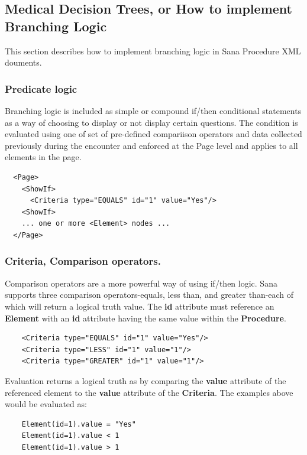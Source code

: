 \documentclass[a4paper,10pt]{article}
\begin{document}
\subsection{Medical Decision Trees, or How to implement Branching Logic}
This section describes how to implement branching logic in Sana Procedure XML
douments. 

\subsubsection{Predicate logic}
Branching logic is included as simple or compound if/then conditional statements
as a way of choosing to display or not display certain questions. The condition
is evaluated using one of set of pre-defined compariison operators and data 
collected previously during the encounter and enforced at the Page level and
applies to all elements in the page.
 
\begin{verbatim}
  <Page>
    <ShowIf>
      <Criteria type="EQUALS" id="1" value="Yes"/>
    <ShowIf>
    ... one or more <Element> nodes ...
  </Page>
\end{verbatim}

\subsubsection{Criteria, Comparison operators.}
Comparison operators are a more powerful way of using if/then logic. Sana
supports three comparison operators-equals, less than, and greater than-each of
which will return a logical truth value. The \textbf{id} attribute must 
reference an \textbf{Element} with an \textbf{id} attribute having the same
value within the \textbf{Procedure}. 

\begin{verbatim}
    <Criteria type="EQUALS" id="1" value="Yes"/>
    <Criteria type="LESS" id="1" value="1"/>
    <Criteria type="GREATER" id="1" value="1"/>
\end{verbatim} 

Evaluation returns a logical truth as by comparing the \textbf{value} attribute
of the referenced element to the \textbf{value} attribute of the 
\textbf{Criteria}. The examples above would be evaluated as:

\begin{verbatim}
    Element(id=1).value = "Yes"
    Element(id=1).value < 1
    Element(id=1).value > 1
\end{verbatim} 
\end{document}
